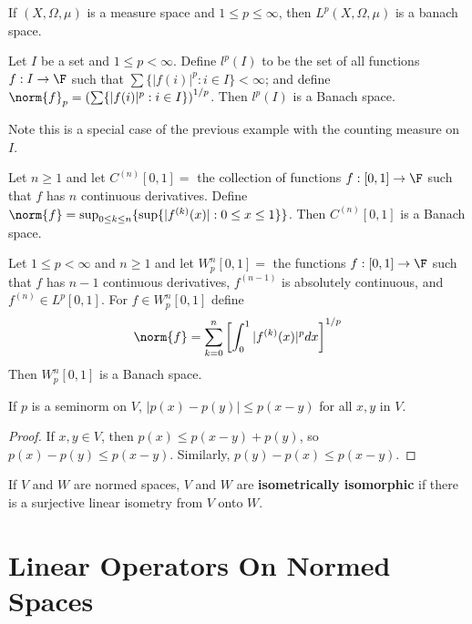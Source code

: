\begin{eg}
    If $(X,\Omega,\mu)$ is a measure space and $1 \leq p \leq \infty$, then $L^p(X,\Omega,\mu)$ is a banach space.
\end{eg}

\begin{eg}
    Let $I$ be a set and $1 \leq p < \infty$. Define $l^p(I)$ to be the set of all functions $f:I\rightarrow \F$ such that $\sum\{|f(i)|^p:i \in I\} < \infty$; and define $\norm{f}_p = \left(\sum\{|f(i)|^p:i \in I\}\right)^{1/p}$. Then $l^p(I)$ is a Banach space.
\end{eg}

Note this is a special case of the previous example with the counting measure on $I$.

\begin{eg}
    Let $n \geq 1$ and let $C^{(n)}[0,1] = $ the collection of functions $f:[0,1]\rightarrow \F$ such that $f$ has $n$ continuous derivatives. Define $\norm{f} = \sup_{0\leq k \leq n}\{\sup\{|f^{(k)}(x)|:0\leq x\leq 1\}\}$. Then $C^{(n)}[0,1]$ is a Banach space.
\end{eg}

\begin{eg}
    Let $1 \leq p < \infty$ and $n \geq 1$ and let $W^n_p[0,1] = $ the functions $f:[0,1]\rightarrow \F$ such that $f$ has $n-1$ continuous derivatives, $f^{(n-1)}$ is absolutely continuous, and $f^{(n)} \in L^p[0,1]$. For $f \in W_p^n[0,1]$ define $$\norm{f} = \sum_{k=0}^{n}\left[\int_0^1|f^{(k)}(x)|^pdx\right]^{1/p}$$
    Then $W_p^n[0,1]$ is a Banach space.
\end{eg}

\begin{prop}
    If $p$ is a seminorm on $V$, $|p(x) - p(y)| \leq p(x-y)$ for all $x,y$ in $V$.
\end{prop}
\begin{proof}
    If $x,y \in V$, then $p(x) \leq p(x-y)+p(y)$, so $p(x)-p(y) \leq p(x-y)$. Similarly, $p(y)-p(x) \leq p(x-y)$.
\end{proof}

\begin{defn}
    If $V$ and $W$ are normed spaces, $V$ and $W$ are \textbf{isometrically isomorphic} if there is a surjective linear isometry from $V$ onto $W$.
\end{defn}



\section{Linear Operators On Normed Spaces}
\label{sec:linOpNorm}

